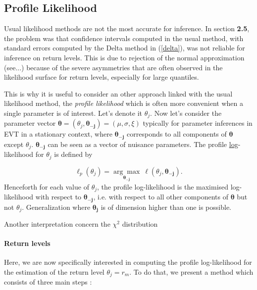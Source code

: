 \documentclass[11pt,a4paper,openany ]{book}
\begin{document}
\subsection*{Profile Likelihood}

Usual likelihood methods are not the most accurate for inference. In section \textbf{2.5}, 
the problem was that confidence intervals computed in the usual method, with standard 
errors computed by the Delta method in (\ref{delta}), was not reliable for inference on 
return levels. This is due to rejection of the normal approximation (see...) because of the 
severe asymmetries that are often observed in the likelihood surface for return levels, 
especially for large quantiles.
\cite{bolivar_profile_2010}

This is why it is useful to consider an other approach linked with the usual likelihood method, the \emph{profile likelihood} which is often more convenient when a single parameter is of interest. Let's denote it $\theta_j$. Now let's consider the parameter vector $\boldsymbol{\theta}=(\theta_j,\boldsymbol{\theta_{-j}})= (\mu,\sigma,\xi)$ typically for parameter inferences in EVT in a stationary context, where $\boldsymbol{\theta_{-j}}$ corresponds to all components of $\boldsymbol{\theta}$ except $\theta_j$. $\boldsymbol{\theta_{-j}}$ can be seen as a vector of nuisance parameters.
The profile \underline{log}-likelihood for $\theta_j$ is defined by 

\begin{equation}
\ell_p(\theta_j)=\underset{\boldsymbol{\theta_{-j}}}{\mathrm{\arg\max}}\ \ell (\theta_j,\boldsymbol{\theta_{-j}}).
\end{equation}
Henceforth for each value of $\theta_j$, the profile log-likelihood is the maximised 
log-likelihood with respect to $\boldsymbol{\theta_{-j}}$, i.e. with respect to all other 
components of $\boldsymbol{\theta}$ but not $\theta_j$.
Generalization where $\boldsymbol{\theta_j}$ is of dimension higher than one is possible.

Another interpretation concern the $\chi^2$ distribution

\paragraph*{Return levels} Here, we are now specifically interested in computing the profile log-likelihood
for the estimation of the return level $\theta_j=r_m$. To do that, we present a method which consists of three main steps :
\end{document}

